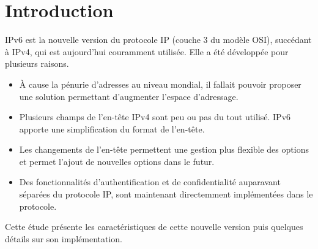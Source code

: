 \section{Introduction}

IPv6 est la nouvelle version du protocole IP (couche 3 du modèle OSI), succédant à IPv4, qui est aujourd'hui couramment utilisée.
Elle a été développée pour plusieurs raisons.
\begin{itemize}
  \item À cause la pénurie d’adresses au niveau mondial, il fallait pouvoir proposer une solution permettant d'augmenter l'espace d'adressage.
  \item Plusieurs champs de l'en-tête IPv4 sont peu ou pas du tout utilisé. IPv6 apporte une simplification du format de l'en-tête.
  \item Les changements de l'en-tête permettent une gestion plus flexible des options et permet l'ajout de nouvelles options dans le futur.
  \item Des fonctionnalités d'authentification et de confidentialité auparavant séparées du protocole IP, sont maintenant directemment implémentées dans le protocole.
\end{itemize}
  
Cette étude présente les caractéristiques de cette nouvelle version puis quelques détails sur son implémentation.
  
